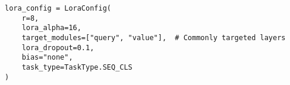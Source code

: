 \begin{lstlisting}[style=mypython, caption={LoRA Configuration}]
lora_config = LoraConfig(
    r=8,
    lora_alpha=16,
    target_modules=["query", "value"],  # Commonly targeted layers
    lora_dropout=0.1,
    bias="none",
    task_type=TaskType.SEQ_CLS
)
\end{lstlisting}
